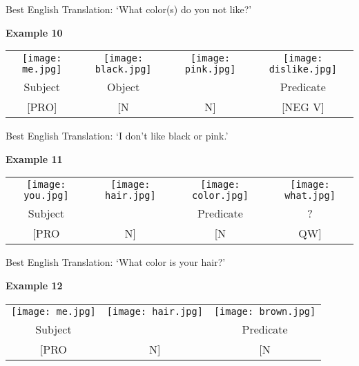 \documentclass{tufte-book}
\begin{document}
Best English Translation: `What color(s) do you not like?'

\vspace{0.25cm}\noindent \textbf{Example 10}
\begin{table*}[h!]
\begin{tabular}{c | c  c | c}
\texttt{[image: me.jpg]}&\texttt{[image: black.jpg]}&\texttt{[image: pink.jpg]} & \texttt{[image: dislike.jpg]} \\
\footnotesize Subject & \footnotesize Object  & & \footnotesize Predicate  \\
\footnotesize [PRO] & \footnotesize [N & \footnotesize N] &  \footnotesize [NEG V]\\
\end{tabular}
\end{table*}

Best English Translation: `I don't like black or pink.'


\vspace{0.25cm}\noindent \textbf{Example 11}
\begin{table*}[h!]
\begin{tabular}{c  c | c  c}
\texttt{[image: you.jpg]}&\texttt{[image: hair.jpg]}&\texttt{[image: color.jpg]} & \texttt{[image: what.jpg]} \\
\footnotesize Subject &   & \footnotesize Predicate & \footnotesize ?  \\
\footnotesize [PRO & \footnotesize N] & \footnotesize [N &  \footnotesize QW]\\
\end{tabular}
\end{table*}

Best English Translation: `What color is your hair?'

\vspace{0.25cm}\noindent \textbf{Example 12}
\begin{table*}[h!]
\begin{tabular}{c  c | c }
\texttt{[image: me.jpg]}&\texttt{[image: hair.jpg]}&\texttt{[image: brown.jpg]}  \\
\footnotesize Subject &   & \footnotesize Predicate   \\
\footnotesize [PRO & \footnotesize N] & \footnotesize [N \\
\end{tabular}
\end{table*}
\end{document}

